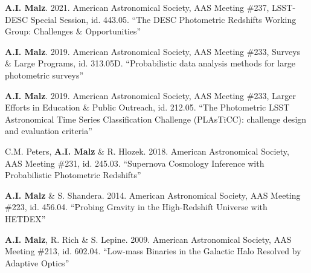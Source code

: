 \begin{list}{}{\malzlist}
	\item {\bf A.I. Malz}. 2021. American Astronomical Society, AAS Meeting \#237, LSST-DESC Special Session, id. 443.05. ``The DESC Photometric Redshifts Working Group: Challenges \& Opportunities'' 
	
	\item {\bf A.I. Malz}. 2019. American Astronomical Society, AAS Meeting \#233, Surveys \& Large Programs, id. 313.05D. ``Probabilistic data analysis methods for large photometric surveys'' 
	\item {\bf A.I. Malz}. 2019. American Astronomical Society, AAS Meeting \#233, Larger Efforts in Education \& Public Outreach, id. 212.05. ``The Photometric LSST Astronomical Time Series Classification Challenge (PLAsTiCC): challenge design and evaluation criteria” 
	
	\item C.M. Peters, {\bf A.I. Malz} \& R. Hlozek. 2018. American Astronomical Society, AAS Meeting \#231, id. 245.03. ``Supernova Cosmology Inference with Probabilistic Photometric Redshifts'' 
	
	\item {\bf A.I. Malz} \& S. Shandera. 2014. American Astronomical Society, AAS Meeting \#223, id. 456.04. ``Probing Gravity in the High-Redshift Universe with HETDEX'' 
	
	\item {\bf A.I. Malz}, R. Rich \& S. Lepine. 2009. American Astronomical Society, AAS Meeting \#213, id. 602.04. ``Low-mass Binaries in the Galactic Halo Resolved by Adaptive Optics'' 
\end{list}
